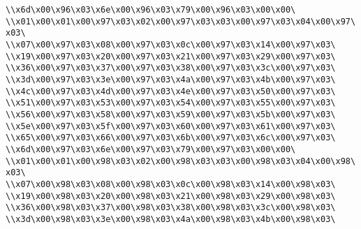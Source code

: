 \verb|\\x6d\x00\x96\x03\x6e\x00\x96\x03\x79\x00\x96\x03\x00\x00\|\newline
\verb|\\x01\x00\x01\x00\x97\x03\x02\x00\x97\x03\x03\x00\x97\x03\x04\x00\x97\x03\|\newline
\verb|\\x07\x00\x97\x03\x08\x00\x97\x03\x0c\x00\x97\x03\x14\x00\x97\x03\|\newline
\verb|\\x19\x00\x97\x03\x20\x00\x97\x03\x21\x00\x97\x03\x29\x00\x97\x03\|\newline
\verb|\\x36\x00\x97\x03\x37\x00\x97\x03\x38\x00\x97\x03\x3c\x00\x97\x03\|\newline
\verb|\\x3d\x00\x97\x03\x3e\x00\x97\x03\x4a\x00\x97\x03\x4b\x00\x97\x03\|\newline
\verb|\\x4c\x00\x97\x03\x4d\x00\x97\x03\x4e\x00\x97\x03\x50\x00\x97\x03\|\newline
\verb|\\x51\x00\x97\x03\x53\x00\x97\x03\x54\x00\x97\x03\x55\x00\x97\x03\|\newline
\verb|\\x56\x00\x97\x03\x58\x00\x97\x03\x59\x00\x97\x03\x5b\x00\x97\x03\|\newline
\verb|\\x5e\x00\x97\x03\x5f\x00\x97\x03\x60\x00\x97\x03\x61\x00\x97\x03\|\newline
\verb|\\x65\x00\x97\x03\x66\x00\x97\x03\x6b\x00\x97\x03\x6c\x00\x97\x03\|\newline
\verb|\\x6d\x00\x97\x03\x6e\x00\x97\x03\x79\x00\x97\x03\x00\x00\|\newline
\verb|\\x01\x00\x01\x00\x98\x03\x02\x00\x98\x03\x03\x00\x98\x03\x04\x00\x98\x03\|\newline
\verb|\\x07\x00\x98\x03\x08\x00\x98\x03\x0c\x00\x98\x03\x14\x00\x98\x03\|\newline
\verb|\\x19\x00\x98\x03\x20\x00\x98\x03\x21\x00\x98\x03\x29\x00\x98\x03\|\newline
\verb|\\x36\x00\x98\x03\x37\x00\x98\x03\x38\x00\x98\x03\x3c\x00\x98\x03\|\newline
\verb|\\x3d\x00\x98\x03\x3e\x00\x98\x03\x4a\x00\x98\x03\x4b\x00\x98\x03\|\newline
